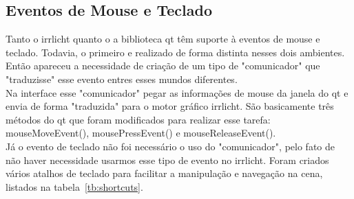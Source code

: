 	\subsection{Eventos de Mouse e Teclado}
	Tanto o irrlicht quanto o a biblioteca qt têm suporte à eventos de mouse e teclado. Todavia, o primeiro e realizado de forma distinta nesses dois ambientes. Então apareceu a necessidade de criação de um tipo de "comunicador" que "traduzisse" esse evento entres esses mundos diferentes.\\

	Na interface esse "comunicador" pegar as informações de mouse da janela do qt e envia de forma "traduzida" para o motor gráfico irrlicht. São basicamente três métodos do qt que foram modificados para realizar esse tarefa: mouseMoveEvent(), mousePressEvent() e mouseReleaseEvent().\\

	Já o evento de teclado não foi necessário o uso do "comunicador", pelo fato de não haver necessidade usarmos esse tipo de evento no irrlicht. Foram criados vários atalhos de teclado para facilitar a manipulação e navegação na cena, listados na tabela~\ref{tb:shortcuts}.

